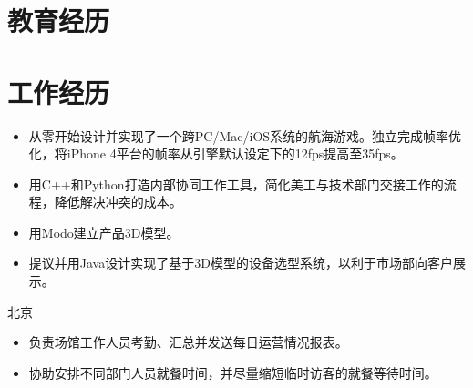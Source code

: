 \documentclass[11pt,a4paper]{moderncv/moderncv}
\begin{document}
\maketitle

\section{教育经历}


\section{工作经历}
{
}

{
\begin{itemize}
	\item 从零开始设计并实现了一个跨PC/Mac/iOS系统的航海游戏。独立完成帧率优化，将iPhone 4平台的帧率从引擎默认设定下的12fps提高至35fps。
	\item 用C++和Python打造内部协同工作工具，简化美工与技术部门交接工作的流程，降低解决冲突的成本。
\end{itemize}
}

{
\begin{itemize}
	\item 用Modo建立产品3D模型。
	\item 提议并用Java设计实现了基于3D模型的设备选型系统，以利于市场部向客户展示。
\end{itemize}
}

{北京}{}
{
\begin{itemize}
	\item 负责场馆工作人员考勤、汇总并发送每日运营情况报表。
	\item 协助安排不同部门人员就餐时间，并尽量缩短临时访客的就餐等待时间。
\end{itemize}
}
\end{document}
